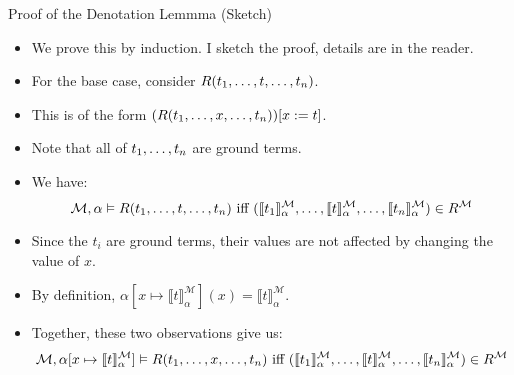 \begin{frame}{Proof of the Denotation Lemmma (Sketch)}

  \begin{itemize}

  \item We prove this by induction. I sketch the proof, details are in
    the reader.

   \item For the base case, consider $R(t_1, \mathellipsis, t,
     \mathellipsis, t_n)$.

     \item This is of the form $(R(t_1, \mathellipsis,x, \mathellipsis,
       t_n))[x:=t]$.

       \item Note that all of $t_1, \mathellipsis, t_n$ are ground
         terms.

         \item We have: {\small\[\mathcal{M},\alpha\vDash R(t_1,
               \mathellipsis, t, 
               \mathellipsis, t_n)\text{ iff }(\llbracket
                t_1\rrbracket^\mathcal{M}_\alpha,\mathellipsis,
                \llbracket
                t\rrbracket^\mathcal{M}_\alpha,\mathellipsis,\llbracket
                t_n\rrbracket^\mathcal{M}_\alpha)\in
                R^\mathcal{M}\]}

            \item Since the $t_i$ are ground terms, their values are
              not affected by changing the value of $x$.

              \item By definition, $\alpha[x\mapsto \llbracket
                t\rrbracket^\mathcal{M}_\alpha](x)=\llbracket
                t\rrbracket^\mathcal{M}_\alpha$.

              \item Together, these two observations give us:
                 {\scriptsize\[\mathcal{M},\alpha[x\mapsto \llbracket
                t\rrbracket^\mathcal{M}_\alpha]\vDash R(t_1,
               \mathellipsis, x, 
               \mathellipsis, t_n)\text{ iff }(\llbracket
                t_1\rrbracket^\mathcal{M}_\alpha,\mathellipsis,
                \llbracket
                t\rrbracket^\mathcal{M}_\alpha,\mathellipsis,\llbracket
                t_n\rrbracket^\mathcal{M}_\alpha)\in
                R^\mathcal{M}\]}
            
  \end{itemize}
  
\end{frame}

